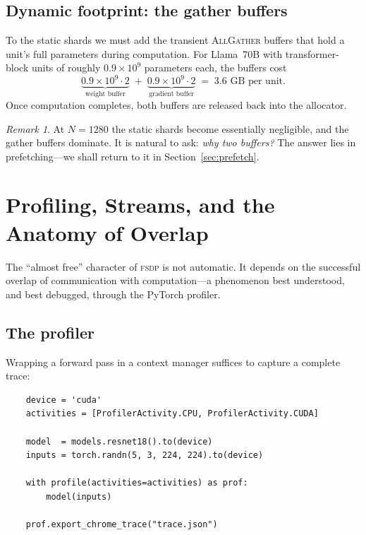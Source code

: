 \documentclass[11pt,a4paper]{article}
\theoremstyle{definition}
\theoremstyle{remark}
\newtheorem*{remark}{Remark}
\newcommand{\FSDP}{\textsc{fsdp}}
\newcommand{\AllGather}{\textsc{AllGather}}
\begin{document}
\subsection{Dynamic footprint: the gather buffers}

To the static shards we must add the transient \AllGather{} buffers that hold a unit's full parameters during computation. For Llama~70B with transformer-block units of roughly $0.9 \times 10^9$ parameters each, the buffers cost
\[
    \underbrace{0.9 \times 10^9 \cdot 2}_{\text{weight buffer}} \;+\; \underbrace{0.9 \times 10^9 \cdot 2}_{\text{gradient buffer}} \;=\; 3.6 \text{ GB per unit}.
\]
Once computation completes, both buffers are released back into the allocator.

\begin{remark}
At $N = 1280$ the static shards become essentially negligible, and the gather buffers dominate. It is natural to ask: \emph{why two buffers?} The answer lies in prefetching---we shall return to it in Section~\ref{sec:prefetch}.
\end{remark}

\section{Profiling, Streams, and the Anatomy of Overlap}


The ``almost free'' character of \FSDP{} is not automatic. It depends on the successful overlap of communication with computation---a phenomenon best understood, and best debugged, through the PyTorch profiler.

\subsection{The profiler}

Wrapping a forward pass in a context manager suffices to capture a complete trace:

\begin{center}
\begin{minipage}{0.88\textwidth}
\small
\begin{verbatim}
    device = 'cuda'
    activities = [ProfilerActivity.CPU, ProfilerActivity.CUDA]

    model  = models.resnet18().to(device)
    inputs = torch.randn(5, 3, 224, 224).to(device)

    with profile(activities=activities) as prof:
        model(inputs)

    prof.export_chrome_trace("trace.json")
\end{verbatim}
\end{minipage}
\end{center}
\end{document}
